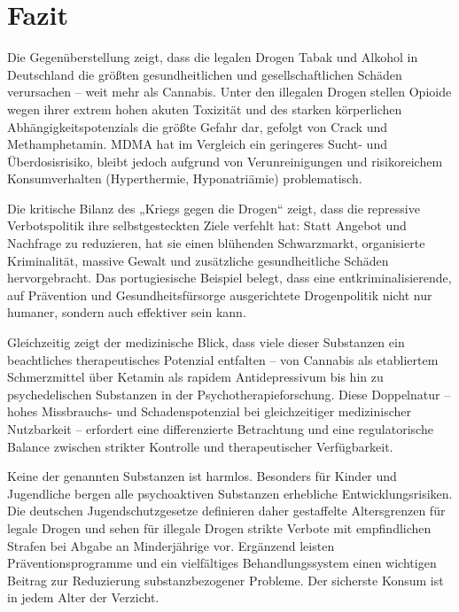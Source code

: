 \documentclass[11pt,a4paper]{article}
\begin{document}
	\section{Fazit}
	
	Die Gegenüberstellung zeigt, dass die legalen Drogen Tabak und Alkohol in Deutschland die größten gesundheitlichen und gesellschaftlichen Schäden verursachen – weit mehr als Cannabis. Unter den illegalen Drogen stellen Opioide wegen ihrer extrem hohen akuten Toxizität und des starken körperlichen Abhängigkeitspotenzials die größte Gefahr dar, gefolgt von Crack und Methamphetamin. MDMA hat im Vergleich ein geringeres Sucht- und Überdosisrisiko, bleibt jedoch aufgrund von Verunreinigungen und risikoreichem Konsumverhalten (Hyperthermie, Hyponatriämie) problematisch. 
	
	Die kritische Bilanz des „Kriegs gegen die Drogen“ zeigt, dass die repressive Verbotspolitik ihre selbstgesteckten Ziele verfehlt hat: Statt Angebot und Nachfrage zu reduzieren, hat sie einen blühenden Schwarzmarkt, organisierte Kriminalität, massive Gewalt und zusätzliche gesundheitliche Schäden hervorgebracht. Das portugiesische Beispiel belegt, dass eine entkriminalisierende, auf Prävention und Gesundheitsfürsorge ausgerichtete Drogenpolitik nicht nur humaner, sondern auch effektiver sein kann.
	
	Gleichzeitig zeigt der medizinische Blick, dass viele dieser Substanzen ein beachtliches therapeutisches Potenzial entfalten – von Cannabis als etabliertem Schmerzmittel über Ketamin als rapidem Antidepressivum bis hin zu psychedelischen Substanzen in der Psychotherapieforschung. Diese Doppelnatur – hohes Missbrauchs- und Schadenspotenzial bei gleichzeitiger medizinischer Nutzbarkeit – erfordert eine differenzierte Betrachtung und eine regulatorische Balance zwischen strikter Kontrolle und therapeutischer Verfügbarkeit.
	
	Keine der genannten Substanzen ist harmlos. Besonders für Kinder und Jugendliche bergen alle psychoaktiven Substanzen erhebliche Entwicklungsrisiken. Die deutschen Jugendschutzgesetze definieren daher gestaffelte Altersgrenzen für legale Drogen und sehen für illegale Drogen strikte Verbote mit empfindlichen Strafen bei Abgabe an Minderjährige vor. Ergänzend leisten Präventionsprogramme und ein vielfältiges Behandlungssystem einen wichtigen Beitrag zur Reduzierung substanzbezogener Probleme. Der sicherste Konsum ist in jedem Alter der Verzicht.
	
\end{document}
